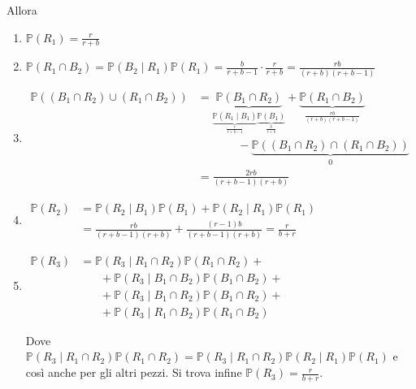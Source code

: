 Allora
\begin{enumerate}
\item $\mathbb{P}( R_{1}) =\frac{r}{r+b}$
\item $\mathbb{P}( R_{1} \cap B_{2}) =\mathbb{P}( B_{2} \mid R_{1})\mathbb{P}( R_{1}) =\frac{b}{r+b-1} \cdotp \frac{r}{r+b} =\frac{rb}{( r+b)( r+b-1)}$
\item $\begin{aligned}
\mathbb{P}(( B_{1} \cap R_{2}) \cup ( R_{1} \cap B_{2})) & =\underbrace{\mathbb{P}( B_{1} \cap R_{2})}_{\underbrace{\mathbb{P}( R_{1} \mid B_{1})}_{\frac{r}{r+b-1}}\underbrace{\mathbb{P}( B_{1})}_{\frac{b}{r+b}}} +\underbrace{\mathbb{P}( R_{1} \cap B_{2})}_{\frac{rb}{( r+b)( r+b-1)}}\\
 & \ \ \ \ \ \ \ \ \ \ \ \ \ \ \ \ -\underbrace{\mathbb{P}(( B_{1} \cap R_{2}) \cap ( R_{1} \cap B_{2}))}_{0}\\
 & =\frac{2rb}{( r+b-1)( r+b)}
\end{aligned}$
\item $\begin{aligned}
\mathbb{P}( R_{2}) & =\mathbb{P}( R_{2} \mid B_{1})\mathbb{P}( B_{1}) +\mathbb{P}( R_{2} \mid R_{1})\mathbb{P}( R_{1})\\
 & =\frac{rb}{( r+b-1)( r+b)} +\frac{( r-1) b}{( r+b-1)( r+b)} =\frac{r}{b+r}
\end{aligned}$
\item $\begin{aligned}
\mathbb{P}( R_{3}) & =\mathbb{P}( R_{3} \mid R_{1} \cap R_{2})\mathbb{P}( R_{1} \cap R_{2}) +\\
 & \ \ \ \ \ \ \ \ +\mathbb{P}( R_{3} \mid B_{1} \cap B_{2})\mathbb{P}( B_{1} \cap B_{2}) +\\
 & \ \ \ \ \ \ \ \ +\mathbb{P}( R_{3} \mid B_{1} \cap R_{2})\mathbb{P}( B_{1} \cap R_{2}) +\\
 & \ \ \ \ \ \ \ \ +\mathbb{P}( R_{3} \mid R_{1} \cap B_{2})\mathbb{P}( R_{1} \cap B_{2})
\end{aligned}$

Dove $\mathbb{P}( R_{3} \mid R_{1} \cap R_{2})\mathbb{P}( R_{1} \cap R_{2}) =\mathbb{P}( R_{3} \mid R_{1} \cap R_{2})\mathbb{P}( R_{2} \mid R_{1})\mathbb{P}( R_{1})$ e così anche per gli altri pezzi. Si trova infine $\mathbb{P}( R_{3}) =\frac{r}{b+r}$.
\end{enumerate}
\Soluzione
\Soluzione
\Soluzione
\Soluzione
